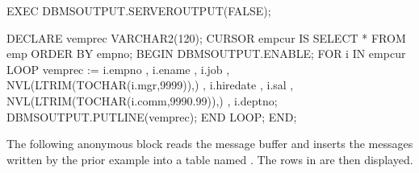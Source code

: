\documentclass[letterpaper,10pt,english,openany,oneside]{sphinxmanual}
\begin{document}
%
\begin{sphinxVerbatim}[commandchars=\\\{\}]
EXEC DBMS\PYGZus{}OUTPUT.SERVEROUTPUT(FALSE);

DECLARE
    v\PYGZus{}emprec        VARCHAR2(120);
    CURSOR emp\PYGZus{}cur IS SELECT * FROM emp ORDER BY empno;
BEGIN
    DBMS\PYGZus{}OUTPUT.ENABLE;
    FOR i IN emp\PYGZus{}cur LOOP
        v\PYGZus{}emprec := i.empno \textbar{}\textbar{} \PYGZsq{},\PYGZsq{} \textbar{}\textbar{} i.ename \textbar{}\textbar{} \PYGZsq{},\PYGZsq{} \textbar{}\textbar{} i.job \textbar{}\textbar{} \PYGZsq{},\PYGZsq{} \textbar{}\textbar{}
            NVL(LTRIM(TO\PYGZus{}CHAR(i.mgr,\PYGZsq{}9999\PYGZsq{})),\PYGZsq{}\PYGZsq{}) \textbar{}\textbar{} \PYGZsq{},\PYGZsq{} \textbar{}\textbar{} i.hiredate \textbar{}\textbar{}
            \PYGZsq{},\PYGZsq{} \textbar{}\textbar{} i.sal \textbar{}\textbar{} \PYGZsq{},\PYGZsq{} \textbar{}\textbar{}
            NVL(LTRIM(TO\PYGZus{}CHAR(i.comm,\PYGZsq{}9990.99\PYGZsq{})),\PYGZsq{}\PYGZsq{}) \textbar{}\textbar{} \PYGZsq{},\PYGZsq{} \textbar{}\textbar{} i.deptno;
        DBMS\PYGZus{}OUTPUT.PUT\PYGZus{}LINE(v\PYGZus{}emprec);
    END LOOP;
END;
\end{sphinxVerbatim}

The following anonymous block reads the message buffer and inserts the
messages written by the prior example into a table named . The
rows in  are then displayed.
\end{document}
